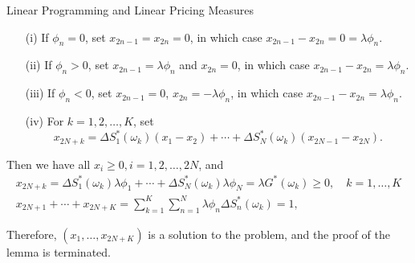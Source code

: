 \documentclass{beamer}
\begin{document}
\begin{frame}{Linear Programming and Linear Pricing Measures}

    {\footnotesize \footnotesize
    \begin{enumerate}
\item[(i)] If $\phi_n = 0$, set $x_{2n-1} = x_{2n} = 0$, in which case $x_{2n-1} - x_{2n} = 0 = \lambda \phi_n$.
\item[(ii)] If $\phi_n > 0$, set $x_{2n-1} = \lambda \phi_n$ and $x_{2n} = 0$, in which case $x_{2n-1} - x_{2n} = \lambda \phi_n$.
\item[(iii)] If $\phi_n < 0$, set $x_{2n-1} = 0$, $x_{2n} = -\lambda \phi_n$, in which case $x_{2n-1} - x_{2n} = \lambda \phi_n$.
\item[(iv)] For $k = 1, 2, \ldots, K$, set
\[
x_{2N+k} = \Delta S_1^*(\omega_k)(x_1 - x_2) + \cdots + \Delta S_N^*(\omega_k)(x_{2N-1} - x_{2N}).
\]
\end{enumerate}
 \pause Then we have all $x_i \geq 0, i = 1, 2, \ldots, 2N$, and
\begin{gather*}
    x_{2N+k} = \Delta S_1^*(\omega_k)\lambda \phi_1 + \cdots + \Delta S_N^*(\omega_k)\lambda \phi_N 
    = \lambda G^*(\omega_k) \geq 0, \quad k = 1, \ldots, K \\
    x_{2N+1} + \cdots + x_{2N+K} = \sum_{k=1}^{K} \sum_{n=1}^{N} \lambda \phi_n \Delta S_n^*(\omega_k) = 1,
\end{gather*}


Therefore, $(x_1, \ldots, x_{2N+K})$ is a solution to the problem, and the proof of the lemma is terminated.

    }
\end{frame}
\end{document}
